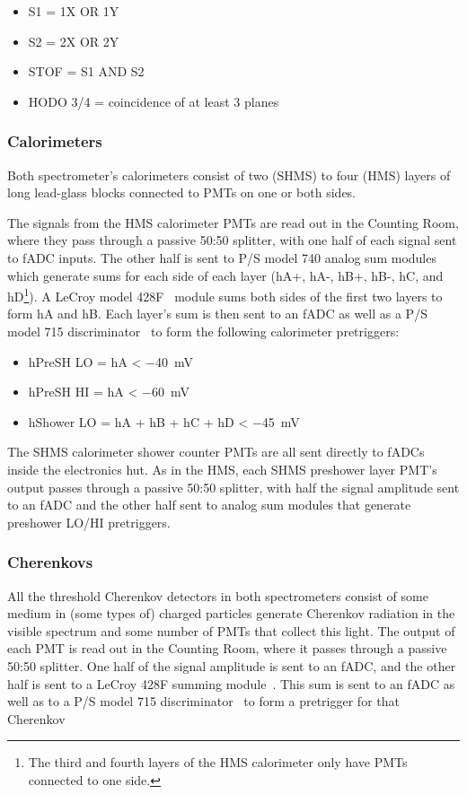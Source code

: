 \begin{itemize}
    \item S1 = 1X OR 1Y
    \item S2 = 2X OR 2Y
    \item STOF = S1 AND S2
    \item HODO 3/4 = coincidence of at least 3 planes
\end{itemize}

\subsubsection{Calorimeters}
Both spectrometer's calorimeters consist of two (SHMS) to four (HMS) layers of
long lead-glass blocks connected to PMTs on one or both sides.


The signals from the HMS calorimeter PMTs are read out in the Counting Room,
where they pass through a passive 50:50 splitter, with one half of each signal
sent to fADC inputs.
The other half is sent to P/S model 740 analog sum modules~\cite{PS740_manual}
which generate sums for each side of each layer (hA+, hA-, hB+, hB-, hC, and
hD\footnote{The third and fourth layers of the HMS calorimeter only have PMTs
connected to one side.}).
A LeCroy model 428F~\cite{LeCroy428F_manual} module sums both sides of the
first two layers to form hA and hB.
Each layer's sum is then sent to an fADC as well as a P/S model 715
discriminator~\cite{PS715_manual} to form the following calorimeter
pretriggers:

\begin{itemize}
    \item hPreSH LO = hA < \SI{-40}{mV}
    \item hPreSH HI = hA < \SI{-60}{mV}
    \item hShower LO = hA + hB + hC + hD < \SI{-45}{mV}
\end{itemize}


The SHMS calorimeter shower counter PMTs are all sent directly to fADCs inside
the electronics hut.
As in the HMS, each SHMS preshower layer PMT's output passes through a passive
50:50 splitter, with half the signal amplitude sent to an fADC and the other
half sent to analog sum modules that generate preshower LO/HI pretriggers.

\subsubsection{Cherenkovs}
All the threshold Cherenkov detectors in both spectrometers consist of some
medium in (some types of) charged particles generate Cherenkov radiation in the
visible spectrum and some number of PMTs that collect this light.
The output of each PMT is read out in the Counting Room, where it passes
through a passive 50:50 splitter.
One half of the signal amplitude is sent to an fADC, and the other half is sent
to a LeCroy 428F summing module~\cite{LeCroy428F_manual}.
This sum is sent to an fADC as well as to a P/S model 715
discriminator~\cite{PS715_manual} to form a pretrigger for that Cherenkov

